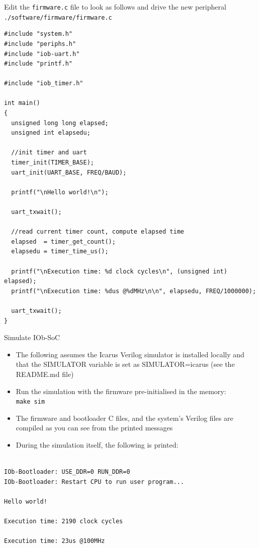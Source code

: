 \documentclass [xcolor=svgnames, t] {beamer}
\begin{document}
\begin{frame}[fragile]{Edit the {\tt firmware.c} file to look as follows and drive the new peripheral}
  {\tt ./software/firmware/firmware.c}
  \begin{tiny}
    \begin{lstlisting}
#include "system.h"
#include "periphs.h"
#include "iob-uart.h"
#include "printf.h"
      
#include "iob_timer.h"

int main()
{
  unsigned long long elapsed;
  unsigned int elapsedu;

  //init timer and uart
  timer_init(TIMER_BASE);
  uart_init(UART_BASE, FREQ/BAUD);

  printf("\nHello world!\n");
  
  uart_txwait();

  //read current timer count, compute elapsed time
  elapsed  = timer_get_count();
  elapsedu = timer_time_us();

  printf("\nExecution time: %d clock cycles\n", (unsigned int) elapsed);
  printf("\nExecution time: %dus @%dMHz\n\n", elapsedu, FREQ/1000000);

  uart_txwait();
}
    \end{lstlisting}
  \end{tiny}
\end{frame}


\begin{frame}[fragile]{Simulate IOb-SoC}
\begin{itemize}
\item The following assumes the Icarus Verilog simulator is installed locally and that the SIMULATOR variable is set as SIMULATOR=icarus (see the README.md file)
\item Run the simulation with the firmware pre-initialised in the memory:\\
  {\tt make sim}
\item The firmware and bootloader C files, and the system's Verilog files are compiled as you can see from the printed messages
\item During the simulation itself, the following is printed:
\end{itemize}

\begin{tiny}
  \begin{lstlisting}

IOb-Bootloader: USE_DDR=0 RUN_DDR=0
IOb-Bootloader: Restart CPU to run user program...

Hello world!

Execution time: 2190 clock cycles

Execution time: 23us @100MHz

  \end{lstlisting}
\end{tiny}
\end{frame}
\end{document}
